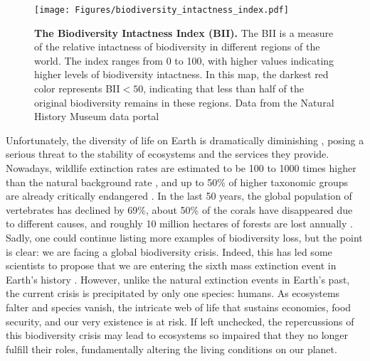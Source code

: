 \begin{figure}[H]
  \centering
  \texttt{[image: Figures/biodiversity\_intactness\_index.pdf]}
  \caption[The Biodiversity Intactness
    Index]{\label{fig:biodiversity_intactness_index} \textbf{The Biodiversity
      Intactness Index (BII).} The BII is a measure of the relative intactness
    of biodiversity in	different regions of the world. The index ranges from 0
    to 100, with higher values indicating higher levels of biodiversity
    intactness. In this map, the darkest red color represents BII$<50$,
    indicating that less than half of the original biodiversity remains in
    these regions. Data from the Natural History Museum data portal
    \cite{Newbold2016}}
\end{figure}

Unfortunately, the diversity of life on Earth is dramatically diminishing
\cite{Hughes1997,Ceballos2002,Pereira2010}, posing a serious threat to the
stability of ecosystems and the services they provide. Nowadays, wildlife
extinction rates are estimated to be 100 to 1000 times higher than the natural
background rate \cite{Ceballos2015,Pimm2014}, and up to 50\% of higher
taxonomic groups are already critically endangered \cite{Smith2009}. In the
last 50 years, the global population of vertebrates has declined by 69\%, about
50\% of the corals have disappeared due to different causes, and roughly 10
million hectares of forests are lost annually \cite{WWF2022}. Sadly, one could
continue listing more examples of biodiversity loss, but the point is clear: we
are facing a global biodiversity crisis. Indeed, this has led some scientists
to propose that we are entering the sixth mass extinction event in Earth's
history \cite{Barnosky2011}. However, unlike the natural extinction events in
Earth’s past, the current crisis is precipitated by only one species: humans.
As ecosystems falter and species vanish, the intricate web of life that
sustains economies, food security, and our very existence is at risk. If left
unchecked, the repercussions of this biodiversity crisis may lead to ecosystems
so impaired that they no longer fulfill their roles, fundamentally altering the
living conditions on our planet.

